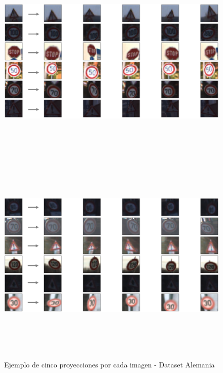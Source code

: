 			\begin{figure}[H]
				\begin{center}
				\includegraphics[width=1\textwidth,height=10cm]{images/desarrollo/Augment/projection_transform2}
				\includegraphics[width=1\textwidth,height=10cm]{images/desarrollo/Augment/projection_transform}
				\end{center}
				\begin{center}
				\vspace{1em}
				\caption{\small{Ejemplo de cinco proyecciones por cada imagen - Dataset Alemania}}
				\vspace{-1em}
			{\small{\fontsize{10}{16.8}\selectfont {Fuente propia}}}
				\end{center}
				\vspace{-1.5em}
			\end{figure}

